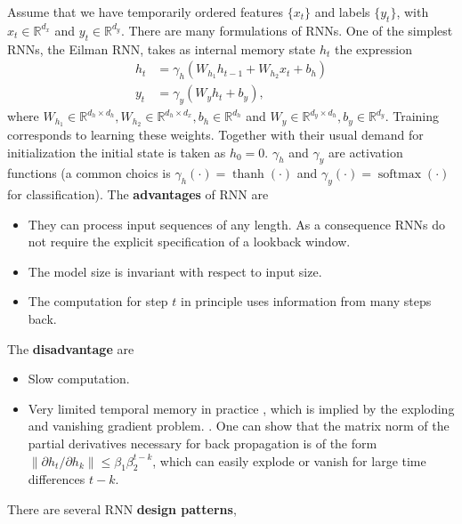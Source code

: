 \documentclass[12pt,a4paper]{article}
\begin{document}
Assume that we have temporarily ordered features $\{x_t\}$ and labels $\{y_t\}$, with  $x_t \in \mathbb R^{d_x}$ and $y_t \in \mathbb R^{d_y}$. There are many formulations of RNNs. One of the simplest RNNs, the Eilman RNN, takes as internal memory state $h_t$ the expression \cite{ELMAN1990179, Goodfellow:2016:DL} 
\begin{align}
	h_t &= \gamma_h\left(W_{h_1} h_{t-1} + W_{h_2} x_t + b_h\right) \\
	y_t &= \gamma_y\left(W_y h_t + b_y\right),
\end{align} 
where $W_{h_1} \in \mathbb R^{d_h \times d_h} ,W_{h_2} \in \mathbb R^{d_h \times d_x}, b_h \in  \mathbb R^{d_h}$ and  $W_y \in \mathbb R^{d_y \times d_h}, b_y \in \mathbb R^{d_y} $. Training corresponds to learning these weights. Together with their usual demand for initialization the initial state is taken as $h_0=0$.
$\gamma_h$ and $\gamma_y$ are activation functions (a common choics is $\gamma_h(\cdot) = \operatorname{thanh} (\cdot)$ and $\gamma_y(\cdot) = \operatorname{softmax} (\cdot)$ for classification). The \textbf{advantages }of  RNN are 
\begin{itemize}
	\item They can process input sequences of any length. As a consequence  RNNs do not require the explicit specification of a lookback window.
	\item The model size is invariant with respect to input size.
	\item The computation for step $t$ in principle uses information from many steps back.
\end{itemize} 
The \textbf{disadvantage} are
\begin{itemize}
	\item Slow computation.
	\item  Very limited temporal memory in practice \cite{bengio_long_term_rnn_1994, 2001_kolen_gradien_flow_rnn}, which is implied by the exploding and vanishing gradient problem. \cite{Goodfellow:2016:DL}.    One can show that the matrix norm of the partial derivatives necessary for back propagation is  of the form $\lVert \partial h_t / \partial h_k \rVert \leq \beta_1 \beta_2 ^ {t-k}$, which can easily explode or vanish for large time differences $t-k$.
\end{itemize}
There are several RNN \textbf{design patterns}, 
\end{document}
